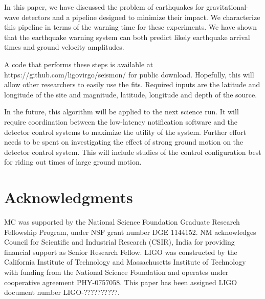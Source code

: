 \documentclass[reprint, prl, aps, showpacs]{revtex4-1}
\begin{document}
In this paper, we have discussed the problem of earthquakes for gravitational-wave detectors and a pipeline designed to minimize their impact. 
We characterize this pipeline in terms of the warning time for these experiments.
We have shown that the earthquake warning system can both predict likely earthquake arrival times and ground velocity amplitudes. 

A code that performs these steps is available at https://github.com/ligovirgo/seismon/ for public download. Hopefully, this will allow other researchers to easily use the fits. Required inputs are the latitude and longitude of the site and magnitude, latitude, longitude and depth of the source.

In the future, this algorithm will be applied to the next science run. It will require coordination between the low-latency notification software and the detector control systems to maximize the utility of the system. 
Further effort needs to be spent on investigating the effect of strong ground motion on the detector control system.
This will include studies of the control configuration best for riding out times of large ground motion.

\section{Acknowledgments}
MC was supported by the National Science Foundation Graduate Research Fellowship
Program, under NSF grant number DGE 1144152. 
NM acknowledges Council for Scientific and Industrial Research (CSIR), India for providing financial support as Senior Research Fellow.  
LIGO was constructed by the California Institute of Technology and Massachusetts Institute of Technology with funding from the National Science Foundation and operates under cooperative agreement PHY-0757058.
This paper has been assigned LIGO document number LIGO-??????????.



\end{document}
